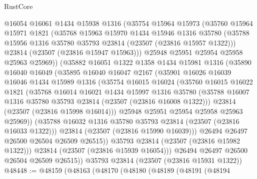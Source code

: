\begin{lexlean}{RustCore}
\begin{coremodule}
          @16054
          @16061
          @1434
          @15938
          @1316
          (@35754
            @15964
            @15973
            (@35760
              @15964
              @15971
              @1821
              (@35768
                @15963
                @15970
                @1434
                @15946
                @1316
                @35780
                (@35788 @15956 @1316 @35780 @35793 @23814 (@23507 (@23816 @15957 @1322)))
                @23814
                (@23507 (@23816 @15947 @15963)))
              @25948
              @25951
              @25954
              @25958
              @25963
              @25969))
          (@35882
            @16051
            @1322
            @1358
            @1434
            @15981
            @1316
            (@35890
              @16040
              @16049
              (@35895
                @16040
                @16047
                @2167
                (@35901
                  @16026
                  @16039
                  @16046
                  @1434
                  @15989
                  @1316
                  (@35754
                    @16015
                    @16024
                    (@35760
                      @16015
                      @16022
                      @1821
                      (@35768
                        @16014
                        @16021
                        @1434
                        @15997
                        @1316
                        @35780
                        (@35788 @16007 @1316 @35780 @35793 @23814 (@23507 (@23816 @16008 @1322)))
                        @23814
                        (@23507 (@23816 @15998 @16014)))
                      @25948
                      @25951
                      @25954
                      @25958
                      @25963
                      @25969))
                  (@35788 @16032 @1316 @35780 @35793 @23814 (@23507 (@23816 @16033 @1322)))
                  @23814
                  (@23507 (@23816 @15990 @16039)))
                @26494
                @26497
                @26500
                @26504
                @26509
                @26515))
            @35793
            @23814
            (@23507 (@23816 @15982 @1322)))
          @23814
          (@23507 (@23816 @15939 @16054)))
        @26494
        @26497
        @26500
        @26504
        @26509
        @26515))
    @35793
    @23814
    (@23507 (@23816 @15931 @1322))
@48448 := @48159
    (@48163
      (@48170
        (@48180
          (@48189
            (@48191
              (@48194

\end{coremodule}
\end{lexlean}
